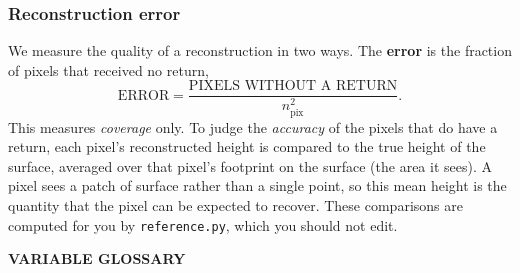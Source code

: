 \documentclass[../../me144_244_student.tex]{subfiles}
\begin{document}
\subsubsection*{Reconstruction error}
We measure the quality of a reconstruction in two ways. The \textbf{error} is the fraction of pixels that
received no return,
\begin{equation}
    \text{ERROR} = \frac{\text{PIXELS WITHOUT A RETURN}}{n_{\text{pix}}^2}.
\end{equation}
This measures \emph{coverage} only. To judge the \emph{accuracy} of the pixels that do have a return, each
pixel's reconstructed height is compared to the true height of the surface, averaged over that pixel's
footprint on the surface (the area it sees). A pixel sees a patch of surface rather than a single point,
so this mean height is the quantity that the pixel can be expected to recover. These comparisons are
computed for you by \texttt{reference.py}, which you should not edit.

\vspace{1 em}
\centerline{ \bf VARIABLE GLOSSARY}
\vspace{.1 in}
\end{document}
